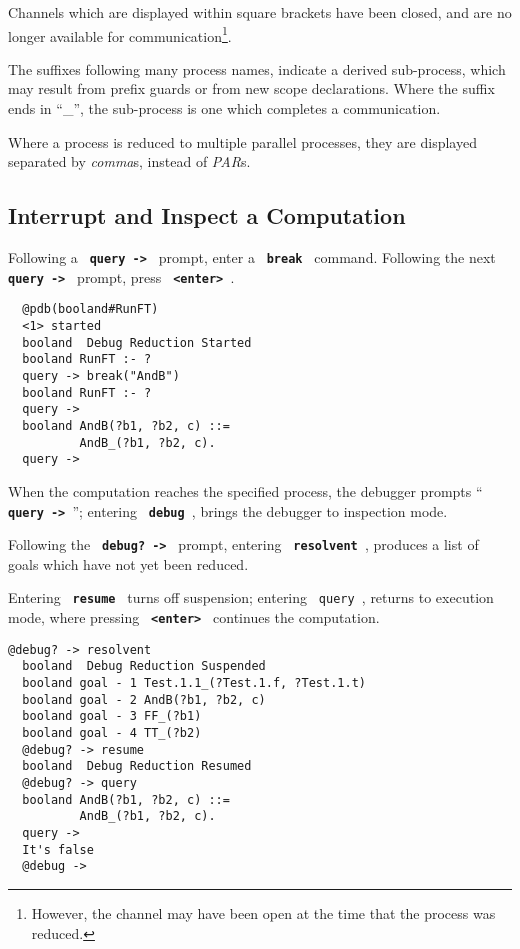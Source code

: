 \documentclass[twoside,10pt]{report}
\begin{document}
\noindent
Channels which are displayed within square brackets have been
closed, and are no longer available for communication\footnote{
However, the channel may have been open at the time that the
process was reduced.}.

\noindent
The suffixes following many process names, indicate a derived
sub-process, which may result from prefix guards or from new
scope declarations.  Where the suffix ends in ``\_'', the
sub-process is one which completes a communication.

\noindent
Where a process is reduced to multiple parallel processes, they
are displayed separated by {\em comma}s, instead of {\em PAR}s.

\subsection{Interrupt and Inspect a Computation}

Following a {\bf \verb+ query -> +} prompt, enter a {\bf \verb+ break +} command.
Following the next {\bf \verb+ query -> +} prompt, press {\bf \verb+ <enter> +}.

\begin{verbatim}
  @pdb(booland#RunFT)
  <1> started
  booland  Debug Reduction Started
  booland RunFT :- ?
  query -> break("AndB")
  booland RunFT :- ?
  query ->
  booland AndB(?b1, ?b2, c) ::=
          AndB_(?b1, ?b2, c).
  query -> 
\end{verbatim}

\noindent
When the computation reaches the specified process, the
debugger prompts ``{\bf \verb+ query -> +}'';
entering {\bf \verb+ debug +}, brings the debugger
to inspection mode.

\noindent
Following the {\bf \verb+ debug? -> +} prompt, entering
{\bf \verb+ resolvent +}, produces a list
of goals which have not yet been reduced.

\noindent
Entering {\bf \verb+ resume +} turns off suspension;
entering \verb+ query +, returns to execution
mode, where pressing {\bf \verb+ <enter> +} continues the computation.

\begin{verbatim}
@debug? -> resolvent
  booland  Debug Reduction Suspended
  booland goal - 1 Test.1.1_(?Test.1.f, ?Test.1.t)
  booland goal - 2 AndB(?b1, ?b2, c)
  booland goal - 3 FF_(?b1)
  booland goal - 4 TT_(?b2)
  @debug? -> resume
  booland  Debug Reduction Resumed
  @debug? -> query
  booland AndB(?b1, ?b2, c) ::=
          AndB_(?b1, ?b2, c).
  query -> 
  It's false
  @debug ->
\end{verbatim}
\end{document}
